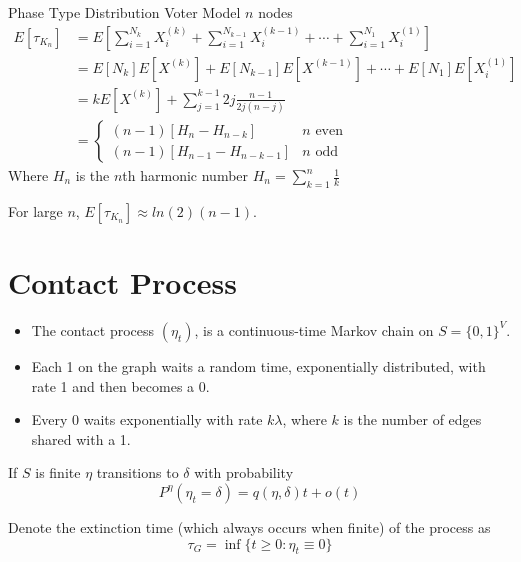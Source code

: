 \documentclass{beamer}
\theoremstyle{definition}
\begin{document}
\begin{frame}{Phase Type Distribution Voter Model $n$ nodes}
    \begin{align*}
    E[\tau_{K_n}] &= E\left[\sum_{i = 1}^{N_k} X_i^{(k)} + \sum_{i = 1}^{N_{k - 1}} X_i^{(k - 1)} + \cdots + \sum_{i = 1}^{N_1} X_i^{(1)}\right]\\
    &= E[N_k] E[X^{(k)}] + E[N_{k - 1}] E[X^{(k - 1)}] + \cdots + E[N_1]E[X_i^{(1)}]\\
    &= k E[X^{(k)}] + \sum_{j = 1}^{k - 1} 2j \frac{n - 1}{2j (n - j)}\\
    &= \begin{cases}
    (n - 1) \left[H_{n} - H_{n - k}\right] & n \text{ even}\\
    (n - 1) \left[H_{n - 1} - H_{n - k - 1}\right] & n \text{ odd}
    \end{cases}
    \end{align*}
Where $H_n$ is the $n$th harmonic number $H_n = \sum_{k = 1}^n \frac{1}{k}$

For large $n$, $E[\tau_{K_n}] \approx ln(2) (n - 1)$.
\end{frame}


\section{Contact Process}

\begin{frame}
\begin{itemize}
    \item The contact process $(\eta_t)$, is a continuous-time Markov chain on $S = \{0,1\}^V$.
    \item Each 1 on the graph waits a random time, exponentially distributed, with rate 1 and then becomes a 0.
    \item Every 0 waits exponentially with rate $k \lambda$, where $k$ is the number of edges shared with a 1.
\end{itemize}

If $S$ is finite $\eta$ transitions to $\delta$ with probability
$$
P^\eta(\eta_t = \delta) = q(\eta, \delta) t + o(t)
$$

Denote the extinction time (which always occurs when finite) of the process as
$$
\tau_{G} = \inf\{ t \geq 0 : \eta_t \equiv 0 \}
$$
\end{frame}
\end{document}
